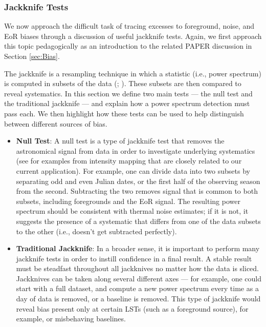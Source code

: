 \documentclass[preprint2,numberedappendix,tighten]{aastex6}  %
\begin{document}
\subsubsection{Jackknife Tests}
\label{sec:JackknifeOverview}

We now approach the difficult task of tracing excesses to foreground, noise, and EoR biases through a discussion of useful 
jackknife tests. Again, we first approach this topic pedagogically as an introduction to the related PAPER discussion in Section 
\ref{sec:Bias}. 

The jackknife is a resampling technique in which a statistic (i.e., power spectrum) is computed in subsets of the data (\citealt{quenouille1949}; \citealt{tukey1958}). These 
subsets are then compared to reveal systematics. In this section we define two main tests --- the null test and the traditional 
jackknife --- and explain how a power spectrum detection must pass each. We then highlight how these tests can be used to 
help distinguish between different sources of bias.
 
\begin{itemize}
\item \textbf{Null Test}: A null test is a type of jackknife test that removes the astronomical signal from data in order to 
investigate underlying systematics (see \citet{keating_et_al2016} for examples from intensity mapping that are closely related to our current application). For example, one can 
divide data into two subsets by separating odd and even Julian dates, or the first half of the observing season from the second. 
Subtracting the two removes signal that is common to both subsets, including foregrounds and the EoR signal. The resulting power 
spectrum should be consistent with thermal noise estimates; if it is not, it suggests the presence of a systematic that differs 
from one of the data subsets to the other (i.e., doesn't get subtracted perfectly). 
\item \textbf{Traditional Jackknife}: In a broader sense, it is important to perform many jackknife tests in order to instill 
confidence in a final result. A stable result must be steadfast throughout all jackknives no matter how the data is sliced. 
Jackknives can be taken along several different axes --- for example, one could start with a full dataset, and compute a new 
power spectrum every time as a day of data is removed, or a baseline is removed. This type of jackknife would reveal bias 
present only at certain LSTs (such as a foreground source), for example, or misbehaving baselines.
\end{itemize}
\end{document}
